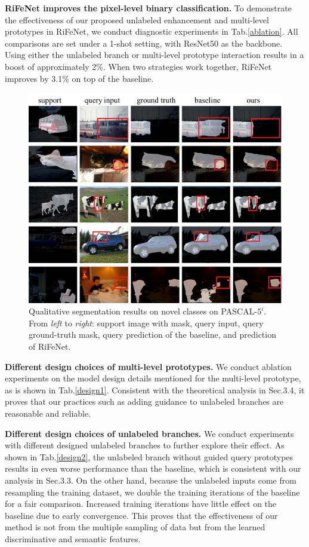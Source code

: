 \documentclass[letterpaper]{article} %
\begin{document}
\textbf{RiFeNet improves the pixel-level binary classification.}
To demonstrate the effectiveness of our proposed unlabeled enhancement and multi-level prototypes in RiFeNet, we conduct diagnostic experiments in Tab.\ref{ablation}. All comparisons are set under a 1-shot setting, with ResNet50 as the backbone. Using either the unlabeled branch or multi-level prototype interaction results in a boost of approximately 2\%. When two strategies work together, RiFeNet improves by 3.1\% on top of the baseline.
\begin{figure}[!t]
\centering
\includegraphics[width=0.95\linewidth]{vis.pdf}
\caption{Qualitative segmentation results on novel classes on PASCAL-$5^i$. From \textit{left} to \textit{right}: support image with mask, query input, query ground-truth mask, query prediction of the baseline, and prediction of RiFeNet.}
\label{segresult}
\end{figure}

\textbf{Different design choices of multi-level prototypes.}
We conduct ablation experiments on the model design details mentioned for the multi-level prototype, as is shown in Tab.\ref{design1}. Consistent with the theoretical analysis in Sec.3.4, it proves that our practices such as adding guidance to unlabeled branches are reasonable and reliable.

\textbf{Different design choices of unlabeled branches.}
We conduct experiments with different designed unlabeled branches to further explore their effect. As shown in Tab.\ref{design2}, the unlabeled branch without guided query prototypes results in even worse performance than the baseline, which is consistent with our analysis in Sec.3.3. On the other hand, because the unlabeled inputs come from resampling the training dataset, we double the training iterations of the baseline for a fair comparison. Increased training iterations have little effect on the baseline due to early convergence. This proves that the effectiveness of our method is not from the multiple sampling of data but from the learned discriminative and semantic features.
\end{document}
